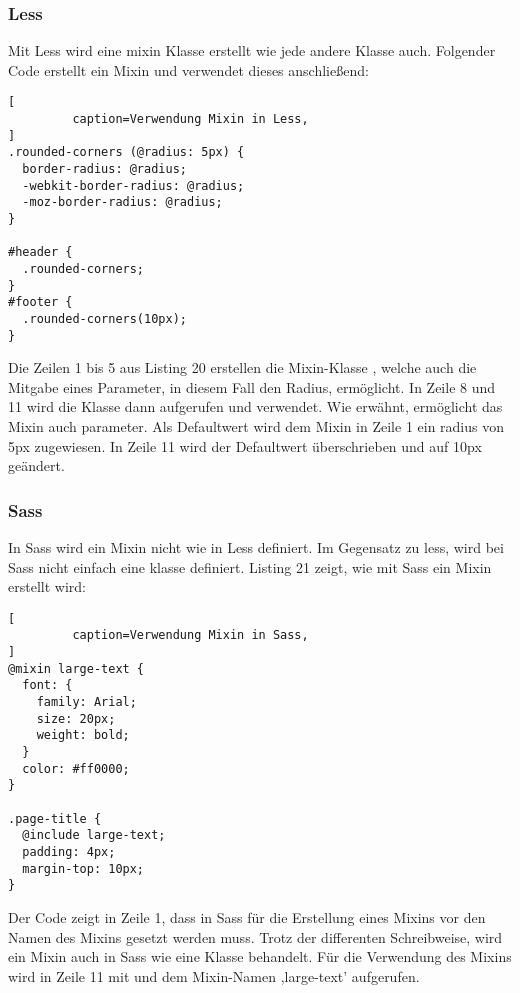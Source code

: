 \subsubsection{Less}
Mit Less wird eine mixin Klasse erstellt wie jede andere Klasse auch. Folgender Code erstellt ein Mixin und verwendet dieses anschließend:
\begin{lstlisting}[
         caption=Verwendung Mixin in Less,
]
.rounded-corners (@radius: 5px) {
  border-radius: @radius;
  -webkit-border-radius: @radius;
  -moz-border-radius: @radius;
}

#header {
  .rounded-corners;
}
#footer {
  .rounded-corners(10px);
}
\end{lstlisting}
Die Zeilen 1 bis 5 aus Listing 20 erstellen die Mixin-Klasse \glqq{}, welche auch die Mitgabe eines Parameter, in diesem Fall den Radius, ermöglicht. \newline
In Zeile 8 und 11 wird die Klasse dann aufgerufen und verwendet. Wie erwähnt, ermöglicht das Mixin auch parameter. Als Defaultwert wird dem Mixin in Zeile 1 ein radius von 5px zugewiesen. In Zeile 11 wird der Defaultwert überschrieben und auf 10px geändert.
\subsubsection{Sass}
In Sass wird ein Mixin nicht wie in Less definiert. Im Gegensatz zu less, wird bei Sass nicht einfach eine klasse definiert. Listing 21 zeigt, wie mit Sass ein Mixin erstellt wird:\newpage
\begin{lstlisting}[
         caption=Verwendung Mixin in Sass,
]
@mixin large-text {
  font: {
    family: Arial;
    size: 20px;
    weight: bold;
  }
  color: #ff0000;
}

.page-title {
  @include large-text;
  padding: 4px;
  margin-top: 10px;
}
\end{lstlisting}
Der Code zeigt in Zeile 1, dass in Sass für die Erstellung eines Mixins \glqq{} vor den Namen des Mixins gesetzt werden muss. Trotz der differenten Schreibweise, wird ein Mixin auch in Sass wie eine Klasse behandelt. \newline
Für die Verwendung des Mixins wird in Zeile 11 mit \glqq{} und dem Mixin-Namen ,large-text' aufgerufen. 
